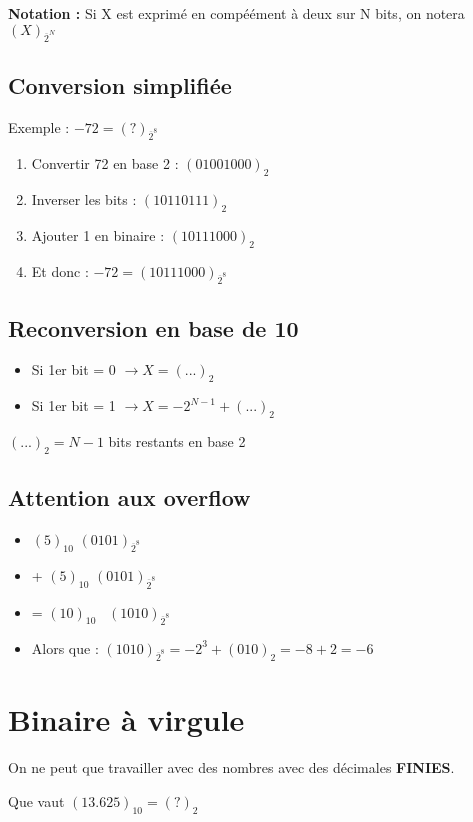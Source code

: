 \documentclass[12pt]{article}
\begin{document}
\textbf{Notation : } Si X est exprimé en compéément à deux sur N bits, on notera $(X)_{\overline{2}^{N}}$

\subsection*{Conversion simplifiée}
Exemple : $-72 = (?)_{\overline{2}^{8}}$
\begin{enumerate}
    \item Convertir 72 en base 2 : $(01001000)_{2}$
    \item Inverser les bits : $(10110111)_{2}$
    \item Ajouter 1 en binaire : $(10111000)_{2}$
    \item Et donc : $-72 = (10111000)_{\overline{2}^{8}}$
\end{enumerate}

\subsection*{Reconversion en base de 10}
\begin{itemize}
    \item Si 1er bit = 0 $\rightarrow X = (...)_2$
    \item Si 1er bit = 1 $\rightarrow X = -2^{N-1} + (...)_2$
\end{itemize}
$(...)_2 = N-1$ bits restants en base 2

\subsection*{Attention aux overflow}
\begin{itemize}
    \item \qquad $(5)_{10}$ \qquad $(0101)_{\overline{2}^8}$
    \item + \quad $(5)_{10}$ \qquad $(0101)_{\overline{2}^8}$
    \item = \quad $(10)_{10}$ \quad \  $(1010)_{\overline{2}^8}$
    \item Alors que : $(1010)_{\overline{2}^8} = -2^{3} + (010)_{2} = -8 + 2 = -6$
\end{itemize}

\section*{Binaire à virgule}
On ne peut que travailler avec des nombres avec des décimales \textbf{FINIES}.

Que vaut $(13.625)_{10} = (?)_{2}$
\end{document}
